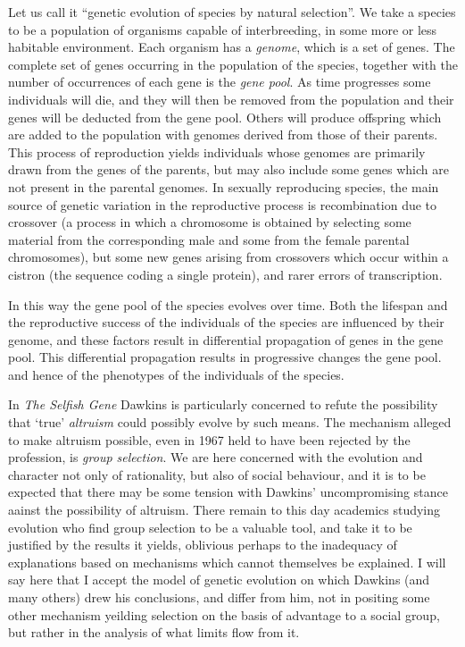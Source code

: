 \documentclass[10pt,titlepage]{book}
\begin{document}
Let us call it ``genetic evolution of species by natural selection''.
We take a species to be a population of organisms capable of interbreeding, in some more or less habitable environment.
Each organism has a \emph{genome}, which is a set of genes.
The complete set of genes occurring in the population of the species, together with the number of occurrences of each gene is the \emph{gene pool}.
As time progresses some individuals will die, and they will then be removed from the population and their genes will be deducted from the gene pool.
Others will produce offspring which are added to the population with genomes derived from those of their parents.
This process of reproduction yields individuals whose genomes are primarily drawn from the genes of the parents, but may also include some genes which are not present in the parental genomes.
In sexually reproducing species, the main source of genetic variation in the reproductive process is recombination due to crossover (a process in which a chromosome is obtained by selecting some material from the corresponding male and some from the female parental chromosomes), but some new genes arising from crossovers which occur within a cistron (the sequence coding a single protein), and rarer errors of transcription. 


In this way the gene pool of the species evolves over time.
Both the lifespan and the reproductive success of the individuals of the species are influenced by their genome, and these factors result in differential propagation of genes in the gene pool.
This differential propagation results in progressive changes the gene pool. and hence of the phenotypes of the individuals of the species.

In \emph{The Selfish Gene} Dawkins is particularly concerned to refute the possibility that `true' \emph{altruism} could possibly evolve by such means.
The mechanism alleged to make altruism possible, even in 1967 held to have been rejected by the profession, is \emph{group selection}.
We are here concerned with the evolution and character not only of rationality, but also of social behaviour, and it is to be expected that there may be some tension with Dawkins' uncompromising stance aainst the possibility of altruism.
There remain to this day academics studying evolution who find group selection to be a valuable tool, and take it to be justified by the results it yields, oblivious perhaps to the inadequacy of explanations based on mechanisms which cannot themselves be explained.
I will say here that I accept the model of genetic evolution on which Dawkins (and many others) drew his conclusions, and differ from him, not in positing some other mechanism yeilding selection on the basis of advantage to a social group, but rather in the analysis of what limits flow from it.
\end{document}
